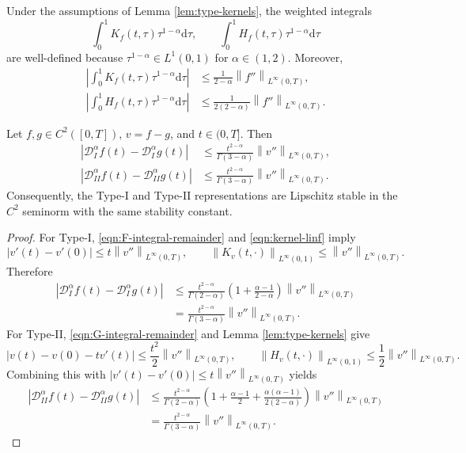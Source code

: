 \documentclass[preprint,3p,times]{elsarticle}
\newcommand{\norm}[1]{\left\lVert #1\right\rVert}
\newcommand{\abs}[1]{\left\lvert #1\right\rvert}
\def\d{\mathrm{d}}
\begin{document}
\begin{corollary}
\label{cor:well-posed}
Under the assumptions of Lemma \ref{lem:type-kernels}, the weighted integrals
\[
    \int_0^1K_f(t,\tau)\tau^{1-\alpha}\d\tau,
    \qquad
    \int_0^1H_f(t,\tau)\tau^{1-\alpha}\d\tau
\]
are well-defined because $\tau^{1-\alpha}\in L^1(0,1)$ for $\alpha\in(1,2)$. Moreover,
\begin{align}
    \left|\int_0^1K_f(t,\tau)\tau^{1-\alpha}\d\tau\right|
    &\le \frac{1}{2-\alpha}\norm{f''}_{L^\infty(0,T)},\label{eqn:K-weight-bound}\\
    \left|\int_0^1H_f(t,\tau)\tau^{1-\alpha}\d\tau\right|
    &\le \frac{1}{2(2-\alpha)}\norm{f''}_{L^\infty(0,T)}.\label{eqn:H-weight-bound}
\end{align}
\end{corollary}

\begin{theorem}
\label{thm:stability}
Let $f,g\in C^2([0,T])$, $v=f-g$, and $t\in(0,T]$. Then
\begin{align}
    \abs{\mathcal D_I^\alpha f(t)-\mathcal D_I^\alpha g(t)}
    &\le
    \frac{t^{2-\alpha}}{\Gamma(3-\alpha)}
    \norm{v''}_{L^\infty(0,T)},\label{eqn:stability-I}\\
    \abs{\mathcal D_{II}^\alpha f(t)-\mathcal D_{II}^\alpha g(t)}
    &\le
    \frac{t^{2-\alpha}}{\Gamma(3-\alpha)}
    \norm{v''}_{L^\infty(0,T)}.\label{eqn:stability-II}
\end{align}
Consequently, the Type-I and Type-II representations are Lipschitz stable in the $C^2$ seminorm with the same stability constant.
\end{theorem}

\begin{proof}
For Type-I, \eqref{eqn:F-integral-remainder} and \eqref{eqn:kernel-linf} imply
\[
    \abs{v'(t)-v'(0)}\le t\norm{v''}_{L^\infty(0,T)},
    \qquad
    \norm{K_v(t,\cdot)}_{L^\infty(0,1)}\le \norm{v''}_{L^\infty(0,T)}.
\]
Therefore
\begin{align*}
\abs{\mathcal D_I^\alpha f(t)-\mathcal D_I^\alpha g(t)}
&\le\frac{t^{2-\alpha}}{\Gamma(2-\alpha)}
\left(1+\frac{\alpha-1}{2-\alpha}\right)\norm{v''}_{L^\infty(0,T)}\\
&=\frac{t^{2-\alpha}}{\Gamma(3-\alpha)}\norm{v''}_{L^\infty(0,T)}.
\end{align*}
For Type-II, \eqref{eqn:G-integral-remainder} and Lemma \ref{lem:type-kernels} give
\[
    \abs{v(t)-v(0)-t v'(t)}\le\frac{t^2}{2}\norm{v''}_{L^\infty(0,T)},
    \qquad
    \norm{H_v(t,\cdot)}_{L^\infty(0,1)}\le\frac12\norm{v''}_{L^\infty(0,T)}.
\]
Combining this with $\abs{v'(t)-v'(0)}\le t\norm{v''}_{L^\infty(0,T)}$ yields
\begin{align*}
\abs{\mathcal D_{II}^\alpha f(t)-\mathcal D_{II}^\alpha g(t)}
&\le\frac{t^{2-\alpha}}{\Gamma(2-\alpha)}
\left(1+\frac{\alpha-1}{2}+\frac{\alpha(\alpha-1)}{2(2-\alpha)}\right)\norm{v''}_{L^\infty(0,T)}\\
&=\frac{t^{2-\alpha}}{\Gamma(3-\alpha)}\norm{v''}_{L^\infty(0,T)}.
\end{align*}
\end{proof}
\end{document}
